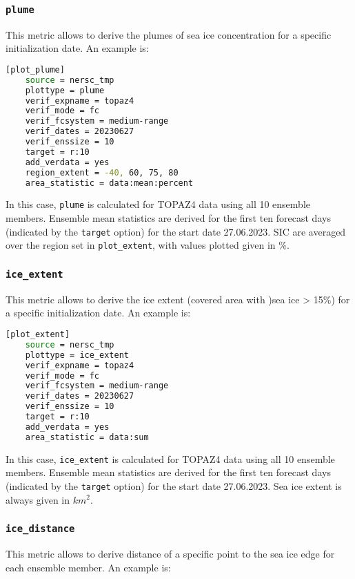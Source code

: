 \documentclass[DIV=10, parskip=full]{scrreprt}
\begin{document}
\subsubsection{\texttt{plume}}
This metric allows to derive the plumes of sea ice concentration for a specific initialization date. An example is:

\begin{lstlisting}[language=bash]
	[plot_plume]
	source = nersc_tmp   
	plottype = plume 
	verif_expname = topaz4 
	verif_mode = fc
	verif_fcsystem = medium-range
	verif_dates = 20230627
	verif_enssize = 10
	target = r:10
	add_verdata = yes
	region_extent = -40, 60, 75, 80
	area_statistic = data:mean:percent
\end{lstlisting}

In this case, \texttt{plume} is calculated for TOPAZ4 data using all 10 ensemble members. Ensemble mean statistics are derived for the first ten forecast days (indicated by the \texttt{target} option) for the start date 27.06.2023. SIC are averaged over the region set in \texttt{plot\_extent}, with values plotted given in \%.

\subsubsection{\texttt{ice\_extent}}
This metric allows to derive the ice extent (covered area with )sea ice > 15\%) for a specific initialization date. An example is:

\begin{lstlisting}[language=bash]
	[plot_extent]
	source = nersc_tmp   
	plottype = ice_extent 
	verif_expname = topaz4 
	verif_mode = fc
	verif_fcsystem = medium-range
	verif_dates = 20230627
	verif_enssize = 10
	target = r:10
	add_verdata = yes
	area_statistic = data:sum
\end{lstlisting}

In this case, \texttt{ice\_extent} is calculated for TOPAZ4 data using all 10 ensemble members. Ensemble mean statistics are derived for the first ten forecast days (indicated by the \texttt{target} option) for the start date 27.06.2023. Sea ice extent is always given in $km^2$.

\subsubsection{\texttt{ice\_distance}}
This metric allows to derive distance of a specific point to the sea ice edge for each ensemble member. An example is:
\end{document}
